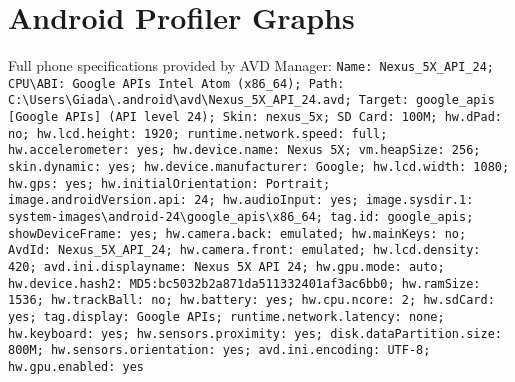 \chapter{Android Profiler Graphs}
\label{appendixD}
\thispagestyle{empty}
\noindent Full phone specifications provided by AVD Manager:
\texttt{Name: Nexus\_5X\_API\_24; CPU\textbackslash ABI: Google APIs Intel Atom (x86\_64); Path: C:\textbackslash Users\textbackslash Giada\textbackslash .android\textbackslash avd\textbackslash Nexus\_5X\_API\_24.avd; Target: google\_apis [Google APIs] (API level 24); Skin: nexus\_5x; SD Card: 100M; hw.dPad: no; hw.lcd.height: 1920; runtime.network.speed: full; hw.accelerometer: yes; hw.device.name: Nexus 5X; vm.heapSize: 256; skin.dynamic: yes; 	hw.device.manufacturer: Google; hw.lcd.width: 1080; hw.gps: yes; 	hw.initialOrientation: Portrait; image.androidVersion.api: 24; hw.audioInput: yes; image.sysdir.1: system-images\textbackslash android-24\textbackslash google\_apis\textbackslash x86\_64; 	tag.id: google\_apis; showDeviceFrame: yes; hw.camera.back: emulated; hw.mainKeys: no; AvdId: Nexus\_5X\_API\_24; hw.camera.front: emulated; hw.lcd.density: 420; avd.ini.displayname: Nexus 5X API 24; hw.gpu.mode: auto; hw.device.hash2: MD5:bc5032b2a871da511332401af3ac6bb0; hw.ramSize: 1536; hw.trackBall: no; hw.battery: yes; hw.cpu.ncore: 2; hw.sdCard: yes; tag.display: Google APIs; runtime.network.latency: none; hw.keyboard: yes; hw.sensors.proximity: yes; disk.dataPartition.size: 800M; 	hw.sensors.orientation: yes; avd.ini.encoding: UTF-8; hw.gpu.enabled: yes }

